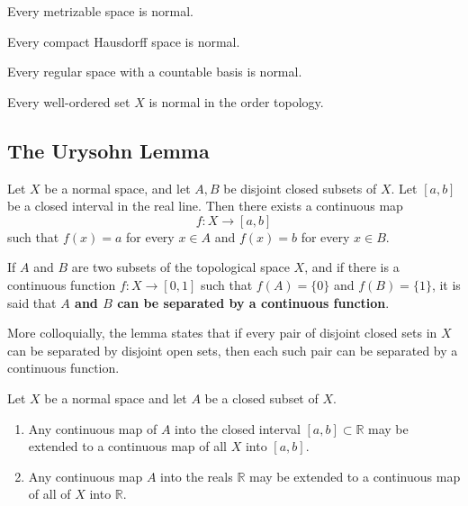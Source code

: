     \begin{theorem}
      Every metrizable space is normal. 
    \end{theorem}

    \begin{theorem}
      Every compact Hausdorff space is normal. 
    \end{theorem}

    \begin{theorem}
      Every regular space with a countable basis is normal. 
    \end{theorem}

    \begin{theorem}
      Every well-ordered set $X$ is normal in the order topology. 
    \end{theorem}

  \subsection{The Urysohn Lemma}

    \begin{theorem}
      Let $X$ be a normal space, and let $A, B$ be disjoint closed subsets of $X$. Let $[a,b]$ be a closed interval in the real line. Then there exists a continuous map
      \begin{equation}
        f: X \longrightarrow [a,b]
      \end{equation}
      such that $f(x) = a$ for every $x \in A$ and $f(x) = b$ for every $x \in B$. 
    \end{theorem}

    \begin{definition}
      If $A$ and $B$ are two subsets of the topological space $X$, and if there is a continuous function $f: X \longrightarrow [0,1]$ such that $f(A) = \{0\}$ and $f(B) = \{1\}$, it is said that \textbf{$A$ and $B$ can be separated by a continuous function}. 
    \end{definition}

    More colloquially, the lemma states that if every pair of disjoint closed sets in $X$ can be separated by disjoint open sets, then each such pair can be separated by a continuous function. 

    \begin{theorem}
      Let $X$ be a normal space and let $A$ be a closed subset of $X$. 
      \begin{enumerate}
        \item Any continuous map of $A$ into the closed interval $[a,b] \subset \mathbb{R}$ may be extended to a continuous map of all $X$ into $[a,b]$. 
        \item Any continuous map $A$ into the reals $\mathbb{R}$ may be extended to a continuous map of all of $X$ into $\mathbb{R}$. 
      \end{enumerate}
    \end{theorem}


